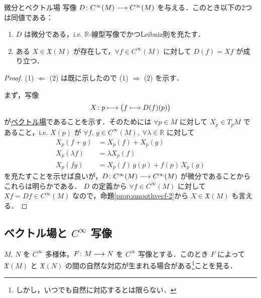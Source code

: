 \documentclass[TQFT_main]{subfiles}
\begin{document}
\begin{myprop}[label=prop:vecf-derivation]{微分とベクトル場}
    写像 $D \colon C^\infty (M) \longrightarrow C^\infty(M)$ を与える．このとき以下の2つは同値である：
    \begin{enumerate}
        \item $D$ は微分である，i.e. $\mathbb{R}$-線型写像でかつLeibniz則を充たす．
        \item ある $X \in \mathfrak{X}(M)$ が存在して，$\forall f \in C^\infty(M)$ に対して $D(f) = Xf$ が成り立つ．
    \end{enumerate}
\end{myprop}

\begin{proof}
    (1) $\Longleftarrow$ (2) は既に示したので (1) $\Longrightarrow$ (2) を示す．

    まず，写像 
    \begin{align}
        X \colon p \longmapsto \bigl(f \longmapsto D(f)(p)\bigr)
    \end{align}
    が\hyperref[def:vecf]{ベクトル場}であることを示す．そのためには $\forall p \in M$ に対して $X_p \in T_p M$ であること，i.e. $X(p)$ が $\forall f,\, g \in C^\infty(M),\; \forall \lambda \in \mathbb{R}$ に対して
    \begin{align}
        X_p(f+g) &= X_p(f) + X_p(g) \\
        X_p(\lambda f) &=\lambda X_p(f) \\
        X_p(fg) &= X_p(f)\, g(p) + f(p)\, X_p(g) 
    \end{align}
    を充たすことを示せば良いが，$D \colon C^\infty (M) \longrightarrow C^\infty (M)$ が微分であることからこれらは明らかである．
    $D$ の定義から $\forall f \in C^\infty (M)$ に対して $Xf = Df \in C^\infty(M)$ なので，命題\ref{prop:smoothvecf-2}から $X \in \mathfrak{X}(M)$ も言える．
\end{proof}

\subsection{ベクトル場と $C^\infty$ 写像}

$M,\, N$ を $C^\infty$ 多様体，$F \colon M \longrightarrow N$ を $C^\infty$ 写像とする．このとき $F$ によって $\mathfrak{X}(M)$ と $\mathfrak{X}(N)$ の間の自然な対応が生まれる場合がある\footnote{しかし，いつでも自然に対応するとは限らない．}ことを見る．
\end{document}
